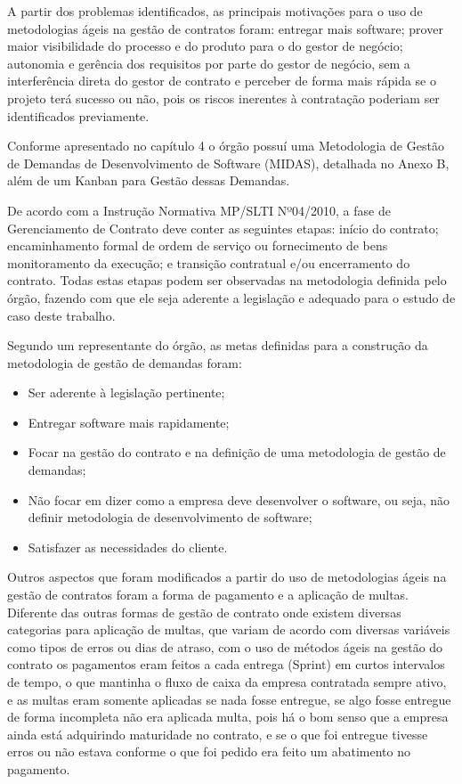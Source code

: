 A partir dos problemas identificados, as principais motivações para o uso de metodologias ágeis na gestão de contratos foram: entregar mais software; prover maior visibilidade do processo e do produto para o do gestor de negócio; autonomia e gerência dos requisitos por parte do gestor de negócio, sem a interferência direta do gestor de contrato e perceber de forma mais rápida se o projeto terá sucesso ou não, pois os riscos inerentes à contratação poderiam ser identificados previamente.

Conforme apresentado no capítulo 4 o órgão possuí uma Metodologia de Gestão de Demandas de Desenvolvimento de Software (MIDAS), detalhada no Anexo B, além de um Kanban para Gestão dessas Demandas. 

De acordo com a Instrução Normativa MP/SLTI Nº04/2010, a fase de Gerenciamento de Contrato deve conter as seguintes etapas: início do contrato; encaminhamento formal de ordem de serviço ou fornecimento de bens  monitoramento da execução; e transição contratual e/ou encerramento do contrato. Todas estas etapas podem ser observadas na metodologia definida pelo órgão, fazendo com que ele seja aderente a legislação e adequado para o estudo de caso deste trabalho.

Segundo um representante do órgão, as metas definidas para a construção da metodologia de gestão de demandas foram:
\begin{itemize}
\item Ser aderente à legislação pertinente;
\item Entregar software mais rapidamente;
\item Focar na gestão do contrato e na definição de uma metodologia de gestão de demandas;
\item Não focar em dizer como a empresa deve desenvolver o software, ou seja, não definir metodologia de desenvolvimento de software;
\item Satisfazer as necessidades do cliente.
\end{itemize}

Outros aspectos que foram modificados a partir do uso de metodologias ágeis na gestão de contratos foram a forma de pagamento e a aplicação de multas. Diferente das outras formas de gestão de contrato onde existem diversas categorias para aplicação de multas, que variam de acordo com diversas variáveis como tipos de erros ou dias de atraso, com o uso de métodos ágeis na gestão do contrato os pagamentos eram feitos a cada entrega (Sprint) em curtos intervalos de tempo, o que mantinha o fluxo de caixa da empresa contratada sempre ativo, e as multas eram somente aplicadas se nada fosse entregue, se algo fosse entregue de forma incompleta não era aplicada multa, pois há o bom senso que a empresa ainda está adquirindo maturidade no contrato, e se o que foi entregue tivesse erros ou não estava conforme o que foi pedido era feito um abatimento no pagamento.

